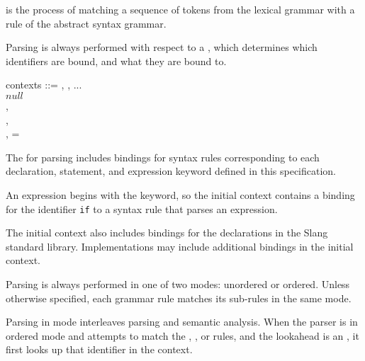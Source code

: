 
 is the process of matching a sequence of tokens from the lexical grammar with a rule of the abstract syntax grammar.


Parsing is always performed with respect to a , which determines which identifiers are bound, and what they are bound to.

\begin{Syntax}
    contexts ::=
        \ContextVarA, \ContextVarB, ...  \\
        \SynOr $null$  \\
        \SynOr \ContextVarA,   \\
        \SynOr \ContextVarA,   \\
        \SynOr \ContextVarA,  =  
\end{Syntax}

The  for parsing includes bindings for syntax rules corresponding to each declaration, statement, and expression keyword defined in this specification.

\begin{Example}
An  expression begins with the  keyword, so the initial context contains a binding for the identifier \lstinline{if} to a syntax rule that parses an  expression. 
\end{Example}

The initial context also includes bindings for the declarations in the Slang standard library.
Implementations may include additional bindings in the initial context.




Parsing is always performed in one of two modes: unordered or ordered.
Unless otherwise specified, each grammar rule matches its sub-rules in the same mode.


Parsing in  mode interleaves parsing and semantic analysis.
When the parser is in ordered mode and attempts to match the , , or  rules, and the lookahead is an , it first looks up that identifier in the context.

